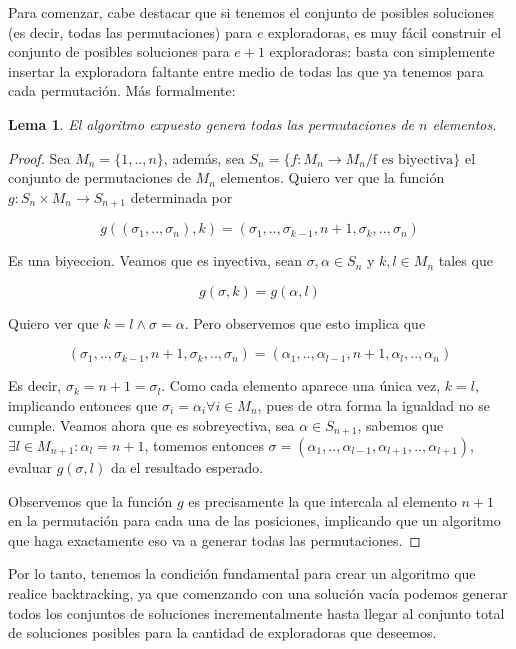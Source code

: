 \documentclass{article}
\newtheorem{lemma}{Lema}[theorem]
\theoremstyle{definition}
\theoremstyle{remark}
\begin{document}
Para comenzar, cabe destacar que si tenemos el conjunto de posibles soluciones (es decir, todas las permutaciones) para $e$ exploradoras, es muy fácil construir el conjunto de posibles soluciones para $e+1$ exploradoras: basta con simplemente insertar la exploradora faltante entre medio de todas las que ya tenemos para cada permutación. Más formalmente:


\begin{lemma}
El algoritmo expuesto genera todas las permutaciones de $n$ elementos.
\label{ej3:generador}
\end{lemma}

\begin{proof}
Sea $M_n = \{1, .., n\}$, además, sea $S_n = \{ f : M_n \to M_n / \text{f es biyectiva}\}$ el conjunto de permutaciones de $M_n$ elementos. Quiero ver que la función $g : S_n \times M_n \to S_{n+1}$ determinada por

$$g((\sigma_1, .., \sigma_n), k) = (\sigma_1, .., \sigma_{k-1}, n+1, \sigma_k, .., \sigma_n)$$

Es una biyeccion. Veamos que es inyectiva, sean $\sigma, \alpha \in S_n$ y $k, l \in M_n$ tales que

$$g(\sigma, k) = g(\alpha, l)$$

Quiero ver que $k = l \wedge \sigma = \alpha$. Pero observemos que esto implica que

$$(\sigma_1, .., \sigma_{k-1}, n+1, \sigma_k, .., \sigma_n) = (\alpha_1, .., \alpha_{l-1}, n+1, \alpha_l, .., \alpha_n)$$

Es decir, $\sigma_k = n + 1 = \sigma_l$. Como cada elemento aparece una única vez, $k = l$, implicando entonces que $\sigma_i = \alpha_i \forall i \in M_n$, pues de otra forma la igualdad no se cumple. Veamos ahora que es sobreyectiva, sea $\alpha \in S_{n+1}$, sabemos que $\exists l \in M_{n+1} : \alpha_l = n+1$, tomemos entonces $\sigma = (\alpha_1, .., \alpha_{l-1}, \alpha_{l+1}, .., \alpha_{l+1})$, evaluar $g(\sigma, l)$ da el resultado esperado.

Observemos que la función $g$ es precisamente la que intercala al elemento $n+1$ en la permutación para cada una de las posiciones, implicando que un algoritmo que haga exactamente eso va a generar todas las permutaciones.
\end{proof}

Por lo tanto, tenemos la condición fundamental para crear un algoritmo que realice backtracking, ya que comenzando con una solución vacía podemos generar todos los conjuntos de soluciones incrementalmente hasta llegar al conjunto total de soluciones posibles para la cantidad de exploradoras que deseemos.
\end{document}
